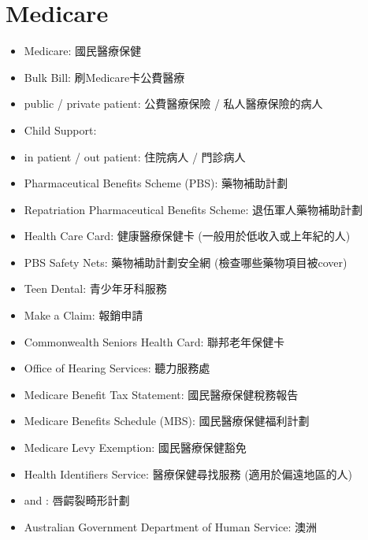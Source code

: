 \section{Medicare}
\begin{itemize}
  \itemsep0em
  \item Medicare: 國民醫療保健
  \item Bulk Bill: 刷Medicare卡公費醫療
  \item public / private patient: 公費醫療保險 / 私人醫療保險的病人
  \item Child Support: 
  \item in patient / out patient: 住院病人 / 門診病人
  \item Pharmaceutical Benefits Scheme (PBS): 藥物補助計劃
  \item Repatriation Pharmaceutical Benefits Scheme: 退伍軍人藥物補助計劃
  \item Health Care Card: 健康醫療保健卡 (一般用於低收入或上年紀的人)
  \item PBS Safety Nets: 藥物補助計劃安全網 (檢查哪些藥物項目被cover)
  \item Teen Dental: 青少年牙科服務
  \item Make a Claim: 報銷申請
  \item Commonwealth Seniors Health Card: 聯邦老年保健卡
  \item Office of Hearing Services: 聽力服務處
  \item Medicare Benefit Tax Statement: 國民醫療保健稅務報告
  \item Medicare Benefits Schedule (MBS): 國民醫療保健福利計劃
  \item Medicare Levy Exemption: 國民醫療保健豁免
  \item Health Identifiers Service: 醫療保健尋找服務 (適用於偏遠地區的人)
  \item {} and : 唇齶裂畸形計劃
  \item Australian Government Department of Human Service: 澳洲
\end{itemize}


